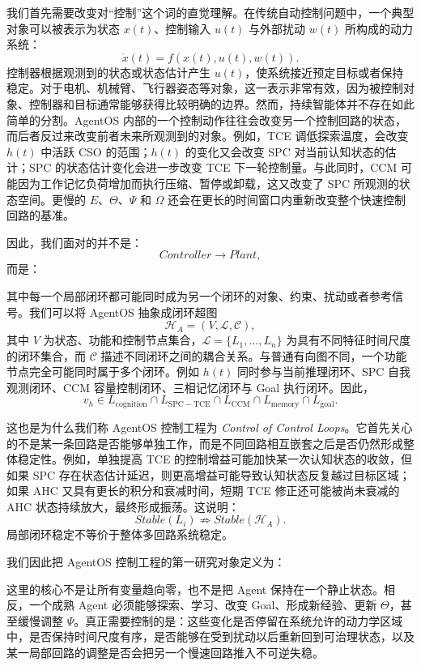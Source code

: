 我们首先需要改变对“控制”这个词的直觉理解。在传统自动控制问题中，一个典型对象可以被表示为状态 $x(t)$、控制输入 $u(t)$ 与外部扰动 $w(t)$ 所构成的动力系统：
\[
\dot{x}(t)=f(x(t),u(t),w(t)).
\]
控制器根据观测到的状态或状态估计产生 $u(t)$，使系统接近预定目标或者保持稳定。对于电机、机械臂、飞行器姿态等对象，这一表示非常有效，因为被控制对象、控制器和目标通常能够获得比较明确的边界。然而，持续智能体并不存在如此简单的分割。AgentOS 内部的一个控制动作往往会改变另一个控制回路的状态，而后者反过来改变前者未来所观测到的对象。例如，TCE 调低探索温度，会改变 $h(t)$ 中活跃 CSO 的范围；$h(t)$ 的变化又会改变 SPC 对当前认知状态的估计；SPC 的状态估计变化会进一步改变 TCE 下一轮控制量。与此同时，CCM 可能因为工作记忆负荷增加而执行压缩、暂停或卸载，这又改变了 SPC 所观测的状态空间。更慢的 $E$、$\Theta$、$\Psi$ 和 $\Omega$ 还会在更长的时间窗口内重新改变整个快速控制回路的基准。

因此，我们面对的并不是：
\[
Controller\rightarrow Plant,
\]
而是：
\begin{statementbox}
\centering
{}
\end{statementbox}
其中每一个局部闭环都可能同时成为另一个闭环的对象、约束、扰动或者参考信号。我们可以将 AgentOS 抽象成闭环超图
\[
\mathcal H_A=(V,\mathcal L,\mathcal C),
\]
其中 $V$ 为状态、功能和控制节点集合，$\mathcal L=\{L_1,\ldots,L_n\}$ 为具有不同特征时间尺度的闭环集合，而 $\mathcal C$ 描述不同闭环之间的耦合关系。与普通有向图不同，一个功能节点完全可能同时属于多个闭环。例如 $h(t)$ 同时参与当前推理闭环、SPC 自我观测闭环、CCM 容量控制闭环、三相记忆闭环与 Goal 执行闭环。因此，
\[
v_h\in L_{\mathrm{cognition}}
\cap
L_{\mathrm{SPC-TCE}}
\cap
L_{\mathrm{CCM}}
\cap
L_{\mathrm{memory}}
\cap
L_{\mathrm{goal}}.
\]

这也是为什么我们称 AgentOS 控制工程为 \emph{Control of Control Loops}。它首先关心的不是某一条回路是否能够单独工作，而是不同回路相互嵌套之后是否仍然形成整体稳定性。例如，单独提高 TCE 的控制增益可能加快某一次认知状态的收敛，但如果 SPC 存在状态估计延迟，则更高增益可能导致认知状态反复越过目标区域；如果 AHC 又具有更长的积分和衰减时间，短期 TCE 修正还可能被尚未衰减的 AHC 状态持续放大，最终形成振荡。这说明：
\[
Stable(L_i)
\not\Rightarrow
Stable(\mathcal H_A).
\]
局部闭环稳定不等价于整体多回路系统稳定。

我们因此把 AgentOS 控制工程的第一研究对象定义为：
\begin{statementbox}
\centering
{}
\end{statementbox}
这里的核心不是让所有变量趋向零，也不是把 Agent 保持在一个静止状态。相反，一个成熟 Agent 必须能够探索、学习、改变 Goal、形成新经验、更新 $\Theta$，甚至缓慢调整 $\Psi$。真正需要控制的是：这些变化是否停留在系统允许的动力学区域中，是否保持时间尺度有序，是否能够在受到扰动以后重新回到可治理状态，以及某一局部回路的调整是否会把另一个慢速回路推入不可逆失稳。

